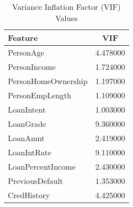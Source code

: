 \begin{table}[H]\centering
\caption{Variance Inflation Factor (VIF) Values}
\label{Table 4:vif_values}
\begin{tabular}{lc}
\toprule
Feature & VIF \\
\midrule
PersonAge & 4.478000 \\
PersonIncome & 1.724000 \\
PersonHomeOwnership & 1.197000 \\
PersonEmpLength & 1.109000 \\
LoanIntent & 1.003000 \\
LoanGrade & 9.360000 \\
LoanAmnt & 2.419000 \\
LoanIntRate & 9.110000 \\
LoanPercentIncome & 2.430000 \\
PreviousDefault & 1.353000 \\
CredHistory & 4.425000 \\
\bottomrule
\end{tabular}
\end{table}
